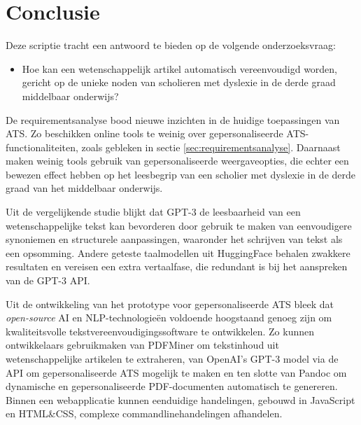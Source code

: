 
\chapter{Conclusie}%
\label{ch:conclusie}

Deze scriptie tracht een antwoord te bieden op de volgende onderzoeksvraag:

\begin{itemize}
	\item Hoe kan een wetenschappelijk artikel automatisch vereenvoudigd worden, gericht op de unieke noden van scholieren met dyslexie in de derde graad middelbaar onderwijs?
\end{itemize}

De requirementsanalyse bood nieuwe inzichten in de huidige toepassingen van ATS. Zo beschikken online tools te weinig over gepersonaliseerde ATS-functionaliteiten, zoals gebleken in sectie \ref{sec:requirementsanalyse}. Daarnaast maken weinig tools gebruik van gepersonaliseerde weergaveopties, die echter een bewezen effect hebben op het leesbegrip van een scholier met dyslexie in de derde graad van het middelbaar onderwijs.

\medspace

Uit de vergelijkende studie blijkt dat GPT-3 de leesbaarheid van een wetenschappelijke tekst kan bevorderen door gebruik te maken van eenvoudigere synoniemen en structurele aanpassingen, waaronder het schrijven van tekst als een opsomming. Andere geteste taalmodellen uit HuggingFace behalen zwakkere resultaten en vereisen een extra vertaalfase, die redundant is bij het aanspreken van de GPT-3 API.

\medspace

Uit de ontwikkeling van het prototype voor gepersonaliseerde ATS bleek dat \textit{open-source} AI en NLP-technologieën voldoende hoogstaand genoeg zijn om kwaliteitsvolle tekstvereenvoudigingssoftware te ontwikkelen. Zo kunnen ontwikkelaars gebruikmaken van PDFMiner om tekstinhoud uit wetenschappelijke artikelen te extraheren, van OpenAI's GPT-3 model via de API om gepersonaliseerde ATS mogelijk te maken en ten slotte van Pandoc om dynamische en gepersonaliseerde PDF-documenten automatisch te genereren. Binnen een webapplicatie kunnen eenduidige handelingen, gebouwd in JavaScript en HTML\&CSS, complexe commandlinehandelingen afhandelen.


